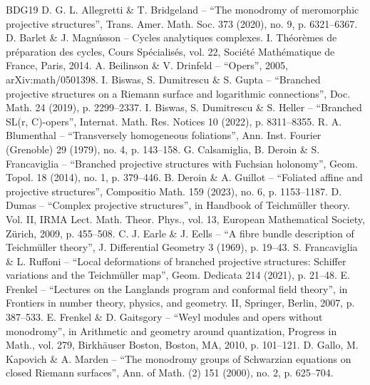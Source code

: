 \documentclass[10pt]{amsart}
\theoremstyle{definition}
\theoremstyle{plain}
\begin{document}
\begin{thebibliography}{BDG19}
 D. G. L. Allegretti \& T. Bridgeland – “The monodromy of meromorphic projective structures”, Trans. Amer. Math. Soc. 373 (2020), no. 9, p. 6321–6367.
 D. Barlet \& J. Magnússon – Cycles analytiques complexes. I. Théorèmes de préparation des cycles, Cours Spécialisés, vol. 22, Société Mathématique de France, Paris, 2014.
 A. Beilinson \& V. Drinfeld – “Opers”, 2005, arXiv:math/0501398.
 I. Biswas, S. Dumitrescu \& S. Gupta – “Branched projective structures on a Riemann surface and logarithmic connections”, Doc. Math. 24 (2019), p. 2299–2337.
 I. Biswas, S. Dumitrescu \& S. Heller – “Branched SL(r, C)-opers”, Internat. Math. Res. Notices 10 (2022), p. 8311–8355.
 R. A. Blumenthal – “Transversely homogeneous foliations”, Ann. Inst. Fourier (Grenoble) 29 (1979), no. 4, p. 143–158.
 G. Calsamiglia, B. Deroin \& S. Francaviglia – “Branched projective structures with Fuchsian holonomy”, Geom. Topol. 18 (2014), no. 1, p. 379–446.
 B. Deroin \& A. Guillot – “Foliated affine and projective structures”, Compositio Math. 159 (2023), no. 6, p. 1153–1187.
 D. Dumas – “Complex projective structures”, in Handbook of Teichmüller theory. Vol. II, IRMA Lect. Math. Theor. Phys., vol. 13, European Mathematical Society, Zürich, 2009, p. 455–508.
 C. J. Earle \& J. Eells – “A fibre bundle description of Teichmüller theory”, J. Differential Geometry 3 (1969), p. 19–43.
 S. Francaviglia \& L. Ruffoni – “Local deformations of branched projective structures: Schiffer variations and the Teichmüller map”, Geom. Dedicata 214 (2021), p. 21–48.
 E. Frenkel – “Lectures on the Langlands program and conformal field theory”, in Frontiers in number theory, physics, and geometry. II, Springer, Berlin, 2007, p. 387–533.
 E. Frenkel \& D. Gaitsgory – “Weyl modules and opers without monodromy”, in Arithmetic and geometry around quantization, Progress in Math., vol. 279, Birkhäuser Boston, Boston, MA, 2010, p. 101–121.
 D. Gallo, M. Kapovich \& A. Marden – “The monodromy groups of Schwarzian equations on closed Riemann surfaces”, Ann. of Math. (2) 151 (2000), no. 2, p. 625–704.

\end{thebibliography}
\end{document}
